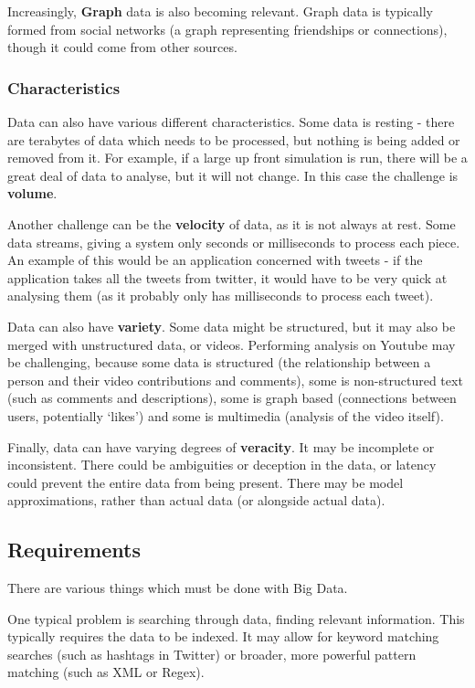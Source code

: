 \documentclass{article}
\begin{document}
Increasingly, \textbf{Graph} data is also becoming relevant. Graph data is typically formed from social networks (a graph representing friendships or connections), though it could come from other sources.

\subsubsection{Characteristics}
Data can also have various different characteristics. Some data is resting - there are terabytes of data which needs to be processed, but nothing is being added or removed from it. For example, if a large up front simulation is run, there will be a great deal of data to analyse, but it will not change. In this case the challenge is \textbf{volume}.

Another challenge can be the \textbf{velocity} of data, as it is not always at rest. Some data streams, giving a system only seconds or milliseconds to process each piece. An example of this would be an application concerned with tweets - if the application takes all the tweets from twitter, it would have to be very quick at analysing them (as it probably only has milliseconds to process each tweet).

Data can also have \textbf{variety}. Some data might be structured, but it may also be merged with unstructured data, or videos. Performing analysis on Youtube may be challenging, because some data is structured (the relationship between a person and their video contributions and comments), some is non-structured text (such as comments and descriptions), some is graph based (connections between users, potentially `likes') and some is multimedia (analysis of the video itself). 

Finally, data can have varying degrees of \textbf{veracity}. It may be incomplete or inconsistent. There could be ambiguities or deception in the data, or latency could prevent the entire data from being present. There may be model approximations, rather than actual data (or alongside actual data). 

\subsection{Requirements}
There are various things which must be done with Big Data.

One typical problem is searching through data, finding relevant information. This typically requires the data to be indexed. It may allow for keyword matching searches (such as hashtags in Twitter) or broader, more powerful pattern matching (such as XML or Regex).
\end{document}
